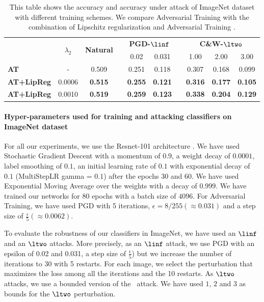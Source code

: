 \begin{table}[htb]
  \centering
  \caption{This table shows the accuracy and accuracy under attack of ImageNet dataset with different training schemes. We compare Adversarial Training with the combination of Lipschitz regularization and Adversarial Training \cite{madry2018towards}. }
    {\footnotesize
    \begin{tabular}{lccccccccc}
    \toprule
      & \multicolumn{1}{c}{\multirow{2}[4]{*}{$\lambda_2$}} & \multicolumn{1}{c}{\multirow{2}[4]{*}{\textbf{Natural}}} &   & \multicolumn{2}{c}{\textbf{PGD-}$\linf$} &   & \multicolumn{3}{c}{\textbf{C\&W-}$\ltwo$} \\
\cmidrule{5-6}\cmidrule{8-10}      &   &   &   & \multicolumn{1}{c}{0.02} & \multicolumn{1}{c}{0.031} &   & \multicolumn{1}{c}{1.00} & \multicolumn{1}{c}{2.00} & \multicolumn{1}{c}{3.00} \\
    \midrule
    \textbf{AT} & \multicolumn{1}{c}{-} & 0.509 &   & 0.251 & 0.118 &   & 0.307 & 0.168 & 0.099 \\
    \textbf{AT+LipReg} & 0.0006 & \textbf{0.515} &   & \textbf{0.255} & \textbf{0.121} &   & \textbf{0.316} & \textbf{0.177} & \textbf{0.105} \\
    \textbf{AT+LipReg} & 0.0010 & \textbf{0.519} &   & \textbf{0.259} & \textbf{0.123} &   & \textbf{0.338} & \textbf{0.204} & \textbf{0.129} \\
    \bottomrule
    \end{tabular}%
    }
\end{table}%


\paragraph{Hyper-parameters used for training and attacking classifiers on ImageNet dataset}

For all our experiments, we use the Resnet-101 architecture \cite{he2016deep}.
We have used Stochastic Gradient Descent with a momentum of $0.9$, a weight decay of $0.0001$, label smoothing of $0.1$, an initial learning rate of $0.1$ with exponential decay of $0.1$ (MultiStepLR gamma = $0.1$) after the epochs $30$ and $60$.
We have used Exponential Moving Average over the weights with a decay of $0.999$.
We have trained our networks for 80 epochs with a batch size of $4096$.
For Adversarial Training, we have used PGD with 5 iterations, $\epsilon = 8/255 (\approx 0.031)$ and a step size of $\frac{\epsilon}{5} (\approx 0.0062)$. 

To evaluate the robustness of our classifiers in ImageNet, we have used an $\linf$ and an $\ltwo$ attacks. More precisely, as an $\linf$ attack, we use PGD with an epsilon of 0.02 and 0.031, a step size of $\textstyle \frac{\epsilon}{5}$) but we increase the number of iterations to 30 with 5 restarts. For each image, we select the perturbation that maximizes the loss among all the iterations and the 10 restarts. As $\ltwo$ attacks, we use a bounded version of the~\cite{carlini2017towards} attack. We have used $1$, $2$ and $3$ as bounds for the $\ltwo$ perturbation. 





